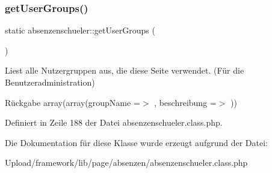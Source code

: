 \subsubsection{\texorpdfstring{get\+User\+Groups()}{getUserGroups()}}
{\footnotesize\ttfamily static absenzenschueler\+::get\+User\+Groups (\begin{DoxyParamCaption}{ }\end{DoxyParamCaption})\hspace{0.3cm}{\ttfamily [static]}}

Liest alle Nutzergruppen aus, die diese Seite verwendet. (Für die Benutzeradministration) \begin{DoxyReturn}{Rückgabe}
array(array(\textquotesingle{}group\+Name\textquotesingle{} =$>$ \textquotesingle{}\textquotesingle{}, \textquotesingle{}beschreibung\textquotesingle{} =$>$ \textquotesingle{}\textquotesingle{})) 
\end{DoxyReturn}


Definiert in Zeile 188 der Datei absenzenschueler.\+class.\+php.



Die Dokumentation für diese Klasse wurde erzeugt aufgrund der Datei\+:\begin{DoxyCompactItemize}
\item 
Upload/framework/lib/page/absenzen/absenzenschueler.\+class.\+php\end{DoxyCompactItemize}

